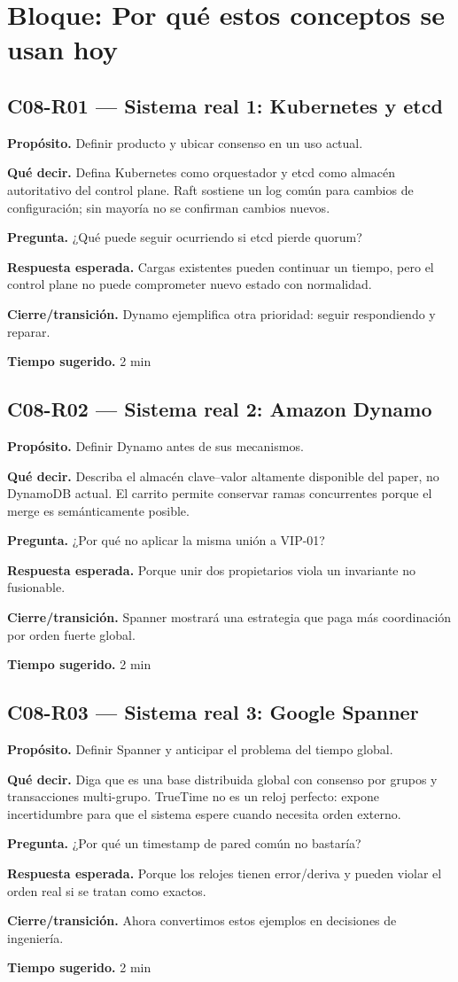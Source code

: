 \documentclass[variant=docente,cover=institutional,mode=screen]{ua-engineering-v6-article}
\newcommand{\FrameField}[2]{\par\noindent\textbf{#1.} #2\par}
\begin{document}
\section{Bloque: Por qué estos conceptos se usan hoy}

\subsection*{C08-R01 --- Sistema real 1: Kubernetes y etcd}
\FrameField{Propósito}{Definir producto y ubicar consenso en un uso actual.}
\FrameField{Qué decir}{Defina Kubernetes como orquestador y etcd como almacén autoritativo del control plane. Raft sostiene un log común para cambios de configuración; sin mayoría no se confirman cambios nuevos.}
\FrameField{Pregunta}{¿Qué puede seguir ocurriendo si etcd pierde quorum?}
\FrameField{Respuesta esperada}{Cargas existentes pueden continuar un tiempo, pero el control plane no puede comprometer nuevo estado con normalidad.}
\FrameField{Cierre/transición}{Dynamo ejemplifica otra prioridad: seguir respondiendo y reparar.}
\FrameField{Tiempo sugerido}{2 min}

\subsection*{C08-R02 --- Sistema real 2: Amazon Dynamo}
\FrameField{Propósito}{Definir Dynamo antes de sus mecanismos.}
\FrameField{Qué decir}{Describa el almacén clave--valor altamente disponible del paper, no DynamoDB actual. El carrito permite conservar ramas concurrentes porque el merge es semánticamente posible.}
\FrameField{Pregunta}{¿Por qué no aplicar la misma unión a VIP-01?}
\FrameField{Respuesta esperada}{Porque unir dos propietarios viola un invariante no fusionable.}
\FrameField{Cierre/transición}{Spanner mostrará una estrategia que paga más coordinación por orden fuerte global.}
\FrameField{Tiempo sugerido}{2 min}

\subsection*{C08-R03 --- Sistema real 3: Google Spanner}
\FrameField{Propósito}{Definir Spanner y anticipar el problema del tiempo global.}
\FrameField{Qué decir}{Diga que es una base distribuida global con consenso por grupos y transacciones multi-grupo. TrueTime no es un reloj perfecto: expone incertidumbre para que el sistema espere cuando necesita orden externo.}
\FrameField{Pregunta}{¿Por qué un timestamp de pared común no bastaría?}
\FrameField{Respuesta esperada}{Porque los relojes tienen error/deriva y pueden violar el orden real si se tratan como exactos.}
\FrameField{Cierre/transición}{Ahora convertimos estos ejemplos en decisiones de ingeniería.}
\FrameField{Tiempo sugerido}{2 min}
\end{document}
